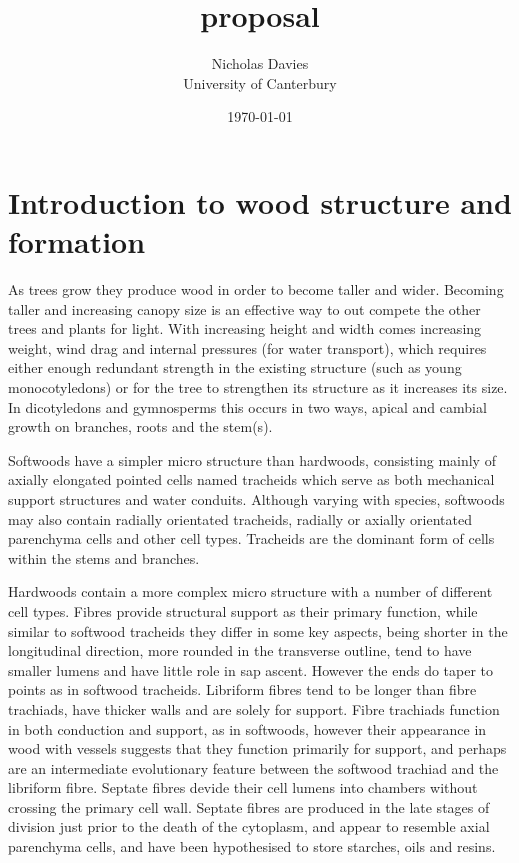 \documentclass{article}
\begin{document}
\title{proposal}

\author{Nicholas Davies\\ University of Canterbury }

\date{\today}



\maketitle

\section{Introduction to wood structure and formation}
As trees grow they produce wood in order to become taller and wider. Becoming
taller and increasing canopy size is an effective way to out compete the other
trees and plants for light. With increasing height and width comes increasing
weight, wind drag and internal pressures (for water transport), which requires
either enough redundant strength in the existing structure (such as young monocotyledons) or
for the tree to strengthen its structure as it increases its size. In
dicotyledons and gymnosperms this occurs in two ways, apical and cambial growth
on branches, roots and the stem(s).

Softwoods have a simpler micro structure than hardwoods, consisting mainly of
axially elongated pointed cells named tracheids which serve as both mechanical
support structures and water conduits. Although varying with species, softwoods
may also contain radially orientated tracheids, radially or axially orientated
parenchyma cells and other cell types. Tracheids are the dominant form of cells
within the stems and branches.

Hardwoods contain a more complex micro structure with a number
of different cell types. Fibres provide structural support as their primary
function, while similar to softwood tracheids they differ in some key aspects,
being shorter in the longitudinal direction, more rounded in the transverse
outline, tend to have smaller lumens and have little role in sap ascent. However
the ends do taper to points as in softwood tracheids. Libriform fibres tend to
be longer than fibre trachiads, have thicker walls and are solely for support.
Fibre trachiads function in both conduction and support, as in softwoods,
however their appearance in wood with vessels suggests that they function
primarily for support, and perhaps are an intermediate evolutionary feature
between the softwood trachiad and the libriform fibre. Septate fibres devide
their cell lumens into chambers without crossing the primary cell wall. Septate
fibres are produced in the late stages of division just prior to the death of
the cytoplasm, and appear to resemble axial parenchyma cells, and have been
hypothesised to store starches, oils and resins.
\end{document}
